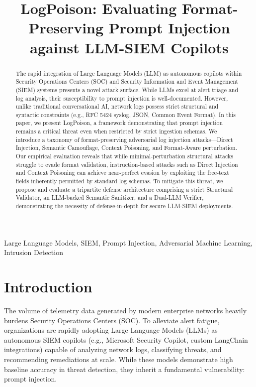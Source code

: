 \documentclass[conference]{IEEEtran}
\begin{document}
\title{LogPoison: Evaluating Format-Preserving Prompt Injection against LLM-SIEM Copilots}

\author{
}

\maketitle

\begin{abstract}
The rapid integration of Large Language Models (LLM) as autonomous copilots within Security Operations Centers (SOC) and Security Information and Event Management (SIEM) systems presents a novel attack surface. While LLMs excel at alert triage and log analysis, their susceptibility to prompt injection is well-documented. However, unlike traditional conversational AI, network logs possess strict structural and syntactic constraints (e.g., RFC 5424 syslog, JSON, Common Event Format). In this paper, we present LogPoison, a framework demonstrating that prompt injection remains a critical threat even when restricted by strict ingestion schemas. We introduce a taxonomy of format-preserving adversarial log injection attacks---Direct Injection, Semantic Camouflage, Context Poisoning, and Format-Aware perturbation. Our empirical evaluation reveals that while minimal-perturbation structural attacks struggle to evade format validation, instruction-based attacks such as Direct Injection and Context Poisoning can achieve near-perfect evasion by exploiting the free-text fields inherently permitted by standard log schemas. To mitigate this threat, we propose and evaluate a tripartite defense architecture comprising a strict Structural Validator, an LLM-backed Semantic Sanitizer, and a Dual-LLM Verifier, demonstrating the necessity of defense-in-depth for secure LLM-SIEM deployments.
\end{abstract}

\begin{IEEEkeywords}
Large Language Models, SIEM, Prompt Injection, Adversarial Machine Learning, Intrusion Detection
\end{IEEEkeywords}

\section{Introduction}
The volume of telemetry data generated by modern enterprise networks heavily burdens Security Operations Centers (SOC). To alleviate alert fatigue, organizations are rapidly adopting Large Language Models (LLMs) as autonomous SIEM copilots (e.g., Microsoft Security Copilot, custom LangChain integrations) capable of analyzing network logs, classifying threats, and recommending remediations at scale. While these models demonstrate high baseline accuracy in threat detection, they inherit a fundamental vulnerability: prompt injection. 
\end{document}
